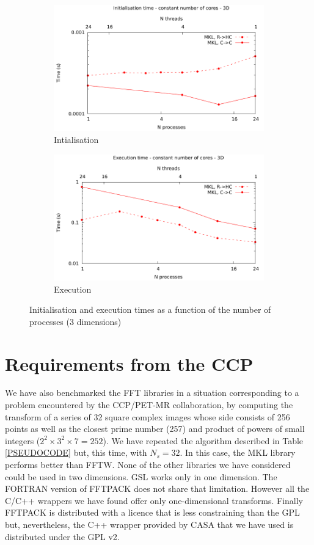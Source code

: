 \documentclass[12pt, a4paper]{article}
\begin{document}
\begin{figure}[H]
\captionsetup{width=0.8\linewidth}
\centering
\begin{subfigure}{.5\textwidth}
\centering
\includegraphics[width=.9\linewidth]{graphs/const-init-3d.pdf}
\caption{Intialisation}
\label{3DCONSTI}
\end{subfigure}%
\begin{subfigure}{.5\textwidth}
\centering
\includegraphics[width=.9\linewidth]{graphs/const-exec-3d.pdf}
\caption{Execution}
\label{3DCONSTE}
\end{subfigure}
\caption{Initialisation and execution times as a function of the number of processes (3 dimensions)}
\label{3DCONST}
\end{figure}

\section{Requirements from the CCP}\label{CCPPETMR}
We have also benchmarked the FFT libraries in a situation corresponding to a problem encountered by the CCP/PET-MR collaboration, by computing the transform of a series of 32 square complex images whose side consists of 256 points as well as the closest prime number (257) and product of powers of small integers ($2^2\times 3^2\times 7=252$). We have repeated the algorithm described in Table \ref{PSEUDOCODE} but, this time, with $N_s=32$. In this case, the MKL library performs better than FFTW. None of the other libraries we have considered could be used in two dimensions. GSL works only in one dimension. The FORTRAN version of FFTPACK does not share that limitation. However all the C/C++ wrappers we have found offer only one-dimensional transforms. Finally FFTPACK is distributed with a licence that is less constraining than the GPL but, nevertheless, the C++ wrapper provided by CASA that we have used is distributed under the GPL v2.
\end{document}
